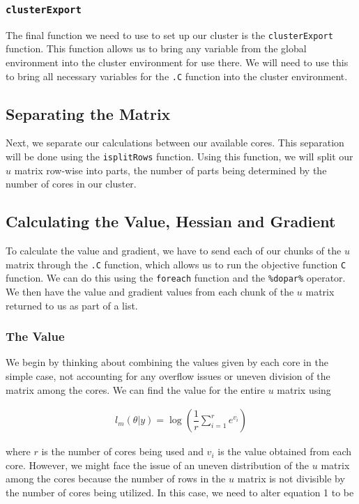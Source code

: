 \documentclass{article}
\begin{document}
\subsubsection{\texttt{clusterExport}}
The final function we need to use to set up our cluster is the \texttt{clusterExport} function. This function allows us to bring any variable from the global environment into the cluster environment for use there. We will need to use this to bring all necessary variables for the \texttt{.C} function into the cluster environment.

\subsection{Separating the Matrix}
Next, we separate our calculations between our available cores. This separation will be done using the \texttt{isplitRows} function. Using this function, we will split our $u$ matrix row-wise into parts, the number of parts being determined by the number of cores in our cluster.

\subsection{Calculating the Value, Hessian and Gradient}
To calculate the value and gradient, we have to send each of our chunks of the $u$ matrix through the \texttt{.C} function, which allows us to run the objective function \texttt{C} function. We can do this using the \texttt{foreach} function and the \texttt{\%dopar\%} operator. We then have the value and gradient values from each chunk of the $u$ matrix returned to us as part of a list.

\subsubsection{The Value}
We begin by thinking about combining the values given by each core in the simple case, not accounting for any overflow issues or uneven division of the matrix among the cores. We can find the value for the entire $u$ matrix using

\begin{align}
l_m(\theta|y) = \log(\dfrac{1}{r}\sum\limits_{i=1}^r e^{v_i})
\end{align}

\noindent where $r$ is the number of cores being used and $v_i$ is the value obtained from each core. However, we might face the issue of an uneven distribution of the $u$ matrix among the cores because the number of rows in the $u$ matrix is not divisible by the number of cores being utilized. In this case, we need to alter equation 1 to be
\end{document}

